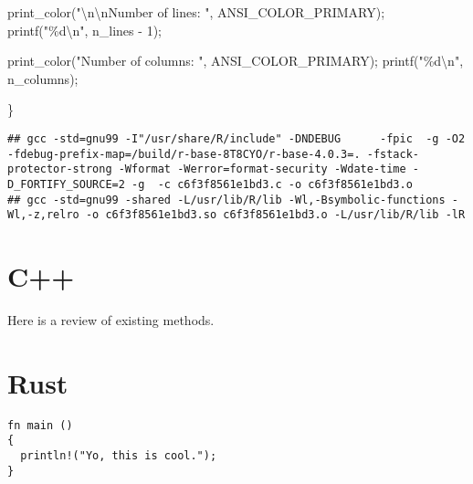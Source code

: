\documentclass[
]{book}
\newenvironment{Shaded}{\begin{snugshade}}{\end{snugshade}}
\newcommand{\DecValTok}[1]{\textcolor[rgb]{0.00,0.00,0.81}{#1}}
\newcommand{\NormalTok}[1]{#1}
\newcommand{\SpecialCharTok}[1]{\textcolor[rgb]{0.00,0.00,0.00}{#1}}
\newcommand{\StringTok}[1]{\textcolor[rgb]{0.31,0.60,0.02}{#1}}
\begin{document}
\begin{Shaded}
\begin{Highlighting}[]
\NormalTok{    print\_color(}\StringTok{"}\SpecialCharTok{\textbackslash{}n\textbackslash{}n}\StringTok{Number of lines: "}\NormalTok{, ANSI\_COLOR\_PRIMARY);}
\NormalTok{    printf(}\StringTok{"\%d}\SpecialCharTok{\textbackslash{}n}\StringTok{"}\NormalTok{, n\_lines {-} }\DecValTok{1}\NormalTok{);}

\NormalTok{    print\_color(}\StringTok{"Number of columns: "}\NormalTok{, ANSI\_COLOR\_PRIMARY);}
\NormalTok{    printf(}\StringTok{"\%d}\SpecialCharTok{\textbackslash{}n}\StringTok{"}\NormalTok{, n\_columns);}

\NormalTok{\}}
\end{Highlighting}
\end{Shaded}

\begin{verbatim}
## gcc -std=gnu99 -I"/usr/share/R/include" -DNDEBUG      -fpic  -g -O2 -fdebug-prefix-map=/build/r-base-8T8CYO/r-base-4.0.3=. -fstack-protector-strong -Wformat -Werror=format-security -Wdate-time -D_FORTIFY_SOURCE=2 -g  -c c6f3f8561e1bd3.c -o c6f3f8561e1bd3.o
## gcc -std=gnu99 -shared -L/usr/lib/R/lib -Wl,-Bsymbolic-functions -Wl,-z,relro -o c6f3f8561e1bd3.so c6f3f8561e1bd3.o -L/usr/lib/R/lib -lR
\end{verbatim}

\hypertarget{c-1}{%
\chapter{C++}\label{c-1}}

Here is a review of existing methods.

\hypertarget{rust}{%
\chapter{Rust}\label{rust}}

\begin{verbatim}
fn main () 
{
  println!("Yo, this is cool.");
}
\end{verbatim}

  
\end{document}
